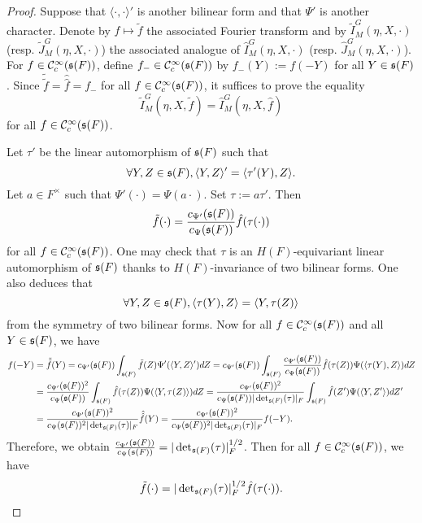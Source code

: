 \documentclass[a4paper]{amsart}
\theoremstyle{definition}
\theoremstyle{remark}
\numberwithin{equation}{subsection}
\begin{document}
\begin{proof}
Suppose that $\langle\cdot,\cdot\rangle'$ is another bilinear form and that $\Psi'$ is another character. Denote by $f\mapsto\tilde{f}$ the associated Fourier transform and by $\tilde{I}_M^G(\eta, X, \cdot)$ (resp. $\tilde{J}_M^G(\eta, X, \cdot)$) the associated analogue of $\hat{I}_M^G(\eta, X, \cdot)$ (resp. $\hat{J}_M^G(\eta, X, \cdot)$). For $f\in{\mathcal {C}}_c^\infty({\mathfrak{s}}(F))$, define $f_{-}\in{\mathcal {C}}_c^\infty({\mathfrak{s}}(F))$ by $f_{-}(Y):=f(-Y)$ for all $Y\in{\mathfrak{s}}(F)$. Since $\tilde{\tilde{f}}=\hat{\hat{f}}=f_{-}$ for all $f\in{\mathcal {C}}_c^\infty({\mathfrak{s}}(F))$, it suffices to prove the equality
$$ \tilde{I}_M^G(\eta, X, \tilde{f})=\hat{I}_M^G(\eta, X, \hat{f}) $$
for all $f\in{\mathcal {C}}_c^\infty({\mathfrak{s}}(F))$. 

Let $\tau'$ be the linear automorphism of ${\mathfrak{s}}(F)$ such that
$$ \forall Y,Z\in{\mathfrak{s}}(F), \langle Y,Z\rangle'=\langle \tau'(Y),Z\rangle. $$
Let $a\in F^\times$ such that $\Psi'(\cdot)=\Psi(a\cdot)$. Set $\tau:=a\tau'$. Then
$$ \tilde{f}(\cdot)=\frac{c_{\Psi'}({\mathfrak{s}}(F))}{c_{\Psi}({\mathfrak{s}}(F))}\hat{f}(\tau(\cdot)) $$
for all $f\in{\mathcal {C}}_c^\infty({\mathfrak{s}}(F))$. One may check that $\tau$ is an $H(F)$-equivariant linear automorphism of ${\mathfrak{s}}(F)$ thanks to $H(F)$-invariance of two bilinear forms. One also deduces that
$$ \forall Y,Z\in{\mathfrak{s}}(F), \langle\tau(Y), Z\rangle=\langle Y,\tau(Z)\rangle $$
from the symmetry of two bilinear forms. Now for all $f\in{\mathcal {C}}_c^\infty({\mathfrak{s}}(F))$ and all $Y\in{\mathfrak{s}}(F)$, we have
\[\begin{split}
f(-Y)&=\tilde{\tilde{f}}(Y)=c_{\Psi'}({\mathfrak{s}}(F)) \int_{{\mathfrak{s}}(F)} \tilde{f}(Z) \Psi'(\langle Y,Z \rangle') dZ =c_{\Psi'}({\mathfrak{s}}(F)) \int_{{\mathfrak{s}}(F)} \frac{c_{\Psi'}({\mathfrak{s}}(F))}{c_{\Psi}({\mathfrak{s}}(F))}\hat{f}(\tau(Z)) \Psi(\langle \tau(Y),Z \rangle) dZ \\
&=\frac{c_{\Psi'}({\mathfrak{s}}(F))^2}{c_{\Psi}({\mathfrak{s}}(F))} \int_{{\mathfrak{s}}(F)} \hat{f}(\tau(Z)) \Psi(\langle Y,\tau(Z) \rangle) dZ=\frac{c_{\Psi'}({\mathfrak{s}}(F))^2}{c_{\Psi}({\mathfrak{s}}(F))|\det_{{\mathfrak{s}}(F)}(\tau)|_F} \int_{{\mathfrak{s}}(F)} \hat{f}(Z') \Psi(\langle Y,Z' \rangle) dZ' \\
&=\frac{c_{\Psi'}({\mathfrak{s}}(F))^2}{c_{\Psi}({\mathfrak{s}}(F))^2|\det_{{\mathfrak{s}}(F)}(\tau)|_F} \hat{\hat{f}}(Y)=\frac{c_{\Psi'}({\mathfrak{s}}(F))^2}{c_{\Psi}({\mathfrak{s}}(F))^2|\det_{{\mathfrak{s}}(F)}(\tau)|_F} f(-Y).
\end{split}\]
Therefore, we obtain $\frac{c_{\Psi'}({\mathfrak{s}}(F))}{c_{\Psi}({\mathfrak{s}}(F))}=|\det_{{\mathfrak{s}}(F)}(\tau)|_F^{1/2}$. Then for all $f\in{\mathcal {C}}_c^\infty({\mathfrak{s}}(F))$, we have
$$ \tilde{f}(\cdot)=|\det\nolimits_{{\mathfrak{s}}(F)}(\tau)|_F^{1/2}\hat{f}(\tau(\cdot)). $$


\end{proof}
\end{document}
